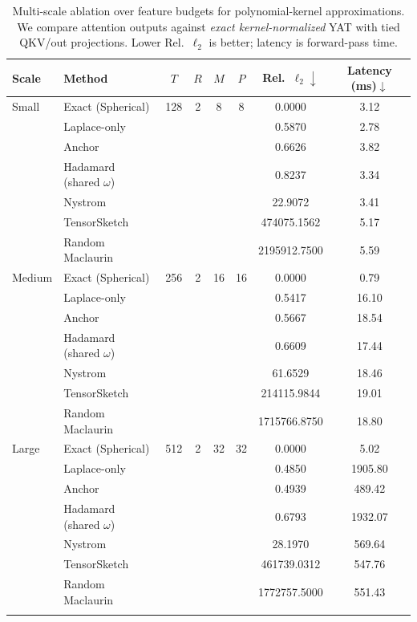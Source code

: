 \documentclass{article}
\begin{document}
\begin{table}[t]
\centering
\small
\caption{Multi-scale ablation over feature budgets for polynomial-kernel approximations. We compare attention outputs against \emph{exact kernel-normalized} YAT with tied QKV/out projections. Lower Rel.~$\ell_2$ is better; latency is forward-pass time.}
\label{tab:poly-sweep}
\begin{tabular}{llcccccc}
\toprule
Scale & Method & $T$ & $R$ & $M$ & $P$ & Rel.~$\ell_2\downarrow$ & Latency (ms)$\downarrow$\\
\midrule
Small & Exact (Spherical) & 128 & 2 & 8 & 8 & 0.0000 & 3.12\\
 & Laplace-only &  &  &  &  & 0.5870 & 2.78\\
 & Anchor &  &  &  &  & 0.6626 & 3.82\\
 & Hadamard (shared $\omega$) &  &  &  &  & 0.8237 & 3.34\\
 & Nystrom &  &  &  &  & 22.9072 & 3.41\\
 & TensorSketch &  &  &  &  & 474075.1562 & 5.17\\
 & Random Maclaurin &  &  &  &  & 2195912.7500 & 5.59\\
\addlinespace
Medium & Exact (Spherical) & 256 & 2 & 16 & 16 & 0.0000 & 0.79\\
 & Laplace-only &  &  &  &  & 0.5417 & 16.10\\
 & Anchor &  &  &  &  & 0.5667 & 18.54\\
 & Hadamard (shared $\omega$) &  &  &  &  & 0.6609 & 17.44\\
 & Nystrom &  &  &  &  & 61.6529 & 18.46\\
 & TensorSketch &  &  &  &  & 214115.9844 & 19.01\\
 & Random Maclaurin &  &  &  &  & 1715766.8750 & 18.80\\
\addlinespace
Large & Exact (Spherical) & 512 & 2 & 32 & 32 & 0.0000 & 5.02\\
 & Laplace-only &  &  &  &  & 0.4850 & 1905.80\\
 & Anchor &  &  &  &  & 0.4939 & 489.42\\
 & Hadamard (shared $\omega$) &  &  &  &  & 0.6793 & 1932.07\\
 & Nystrom &  &  &  &  & 28.1970 & 569.64\\
 & TensorSketch &  &  &  &  & 461739.0312 & 547.76\\
 & Random Maclaurin &  &  &  &  & 1772757.5000 & 551.43\\
\addlinespace
\bottomrule
\end{tabular}
\end{table}
\end{document}
